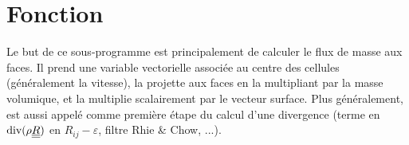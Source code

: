 %
%
%
%
%
%
%
%


\vspace{1cm}
\section{Fonction}
Le but de ce sous-programme est principalement de calculer le flux de masse aux
faces. Il prend une variable vectorielle associ\'ee au centre des cellules
(g\'en\'eralement la vitesse), la projette aux faces en la multipliant par la
masse volumique, et la multiplie scalairement par le vecteur surface.
Plus g\'en\'eralement,  est aussi appel\'e comme premi\`ere \'etape
du calcul d'une divergence (terme en $\text{div}(\rho\underline{\underline{R}})$ en
$R_{ij}-\varepsilon$, filtre Rhie \& Chow, ...).


